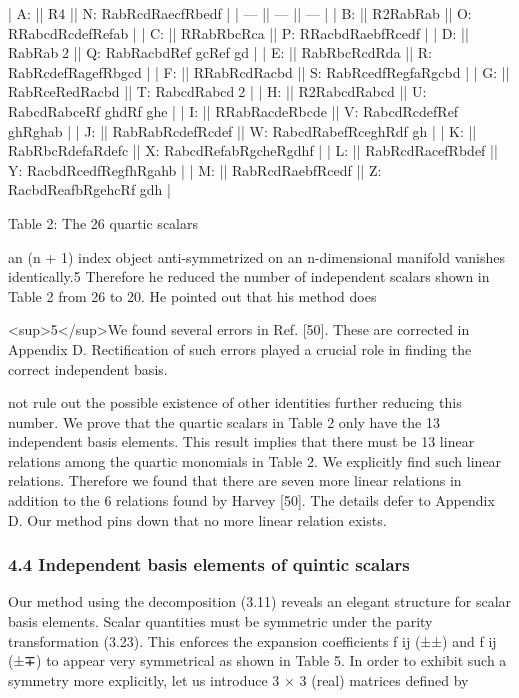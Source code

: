\documentclass{article}
\begin{document}
| A:  || R4               || N: RabRcdRaecfRbedf       |
| --- || ---              || ---                       |
| B:  || R2RabRab         || O: RRabcdRcdefRefab       |
| C:  || RRabRbcRca       || P: RRacbdRaebfRcedf       |
| D:  ||   RabRab2       || Q: RabRacbdRef gcRef gd   |
| E:  || RabRbcRcdRda     || R: RabRcdefRagefRbgcd     |
| F:  || RRabRcdRacbd     || S: RabRcedfRegfaRgcbd     |
| G:  || RabRceRedRacbd   || T:   RabcdRabcd2         |
| H:  || R2RabcdRabcd     || U: RabcdRabceRf ghdRf ghe |
| I:  || RRabRacdeRbcde   || V: RabcdRcdefRef ghRghab  |
| J:  || RabRabRcdefRcdef || W: RabcdRabefRceghRdf gh  |
| K:  || RabRbcRdefaRdefc || X: RabcdRefabRgcheRgdhf   |
| L:  || RabRcdRacefRbdef || Y: RacbdRcedfRegfhRgahb   |
| M:  || RabRcdRaebfRcedf || Z: RacbdReafbRgehcRf gdh  |

Table 2: The 26 quartic scalars

an (n + 1) index object anti-symmetrized on an n-dimensional manifold vanishes identically.5 Therefore he reduced the number of independent scalars shown in Table 2 from 26 to 20. He pointed out that his method does

<sup>5</sup>We found several errors in Ref. [50]. These are corrected in Appendix D. Rectification of such errors played a crucial role in finding the correct independent basis.

not rule out the possible existence of other identities further reducing this number. We prove that the quartic scalars in Table 2 only have the 13 independent basis elements. This result implies that there must be 13 linear relations among the quartic monomials in Table 2. We explicitly find such linear relations. Therefore we found that there are seven more linear relations in addition to the 6 relations found by Harvey [50]. The details defer to Appendix D. Our method pins down that no more linear relation exists.

\subsubsection{4.4 Independent basis elements of quintic scalars}

Our method using the decomposition (3.11) reveals an elegant structure for scalar basis elements. Scalar quantities must be symmetric under the parity transformation (3.23). This enforces the expansion coefficients f ij (±±) and f ij (±∓) to appear very symmetrical as shown in Table 5. In order to exhibit such a symmetry more explicitly, let us introduce 3 × 3 (real) matrices defined by
\end{document}
